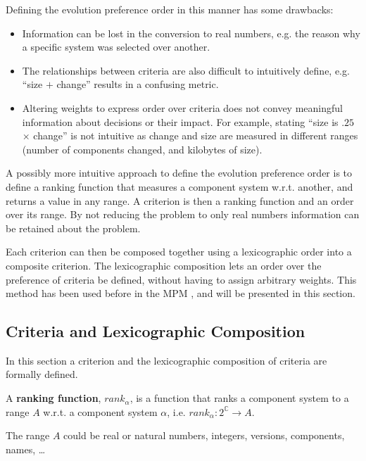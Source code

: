 Defining the evolution preference order in this manner has some drawbacks:
\begin{itemize}
  \item Information can be lost in the conversion to real numbers, e.g. the reason why a specific system was selected over another.
  \item The relationships between criteria are also difficult to intuitively define, e.g. ``size $+$ change'' results in a confusing metric.
  \item Altering weights to express order over criteria does not convey meaningful information about decisions or their impact.
  For example, stating ``size is $.25$ $\times$ change'' is not intuitive as change and size are measured in different ranges (number of components changed, and kilobytes of size).
\end{itemize}

A possibly more intuitive approach to define the evolution preference order is to define a ranking function that measures a component system w.r.t. another, and returns a value in any range.
A criterion is then a ranking function and an order over its range. 
By not reducing the problem to only real numbers information can be retained about the problem.

Each criterion can then be composed together using a lexicographic order into a composite criterion.
The lexicographic composition lets an order over the preference of criteria be defined, without having to assign arbitrary weights.
This method has been used before in the MPM \citep{abate2011}, and will be presented in this section.

\subsection{Criteria and Lexicographic Composition}
In this section a criterion and the lexicographic composition of criteria are formally defined.

\begin{defs}
A \textbf{ranking function}, $rank_{\alpha}$, is a function that ranks a component system to a range $A$ w.r.t. a component system $\alpha$, i.e. $rank_{\alpha} : 2^{\mathbb{C}} \rightarrow A$.
\end{defs}
The range $A$ could be real or natural numbers, integers, versions, components, names, \ldots

